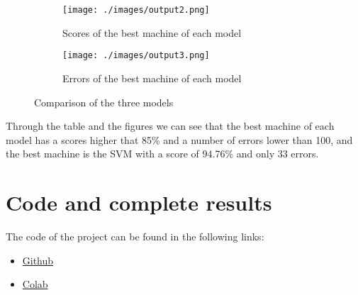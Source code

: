 \documentclass{article}
\theoremstyle{mytheoremstyle}
\theoremstyle{mytheoremstyle}
\theoremstyle{myproblemstyle}
\begin{document}
\newpage

\begin{figure}[htbp]
  \centering
  \begin{subfigure}{0.45\textwidth}
    \centering
    \texttt{[image: ./images/output2.png]}
    \caption{Scores of the best machine of each model}
    \label{fig:Scores of the best machine of each model}
  \end{subfigure}
  \begin{subfigure}{0.45\textwidth}
    \centering
    \texttt{[image: ./images/output3.png]}
    \caption{Errors of the best machine of each model}
    \label{fig:Errors of the best machine of each model}
  \end{subfigure}
  \caption{Comparison of the three models}
  \label{fig:Comparison of the three models}
\end{figure}

Through the table and the figures we can see that the best machine of each model has a scores higher that 85\% and a number of errors lower than 100, and the best machine is the SVM with a score of 94.76\% and only 33 errors.

\section*{Code and complete results}

The code of the project can be found in the following links:

\begin{itemize}
  \item \href{https://github.com/LeoGCode/Binary-Classification-of-the-Iranian-churn-dataset-using-learning-models}{Github}
  \item \href{https://colab.research.google.com/drive/1JCz9-1xjXYKbvUTu2uQSQHJp_Aw0XzHd?usp=sharing}{Colab}
\end{itemize}
\end{document}
